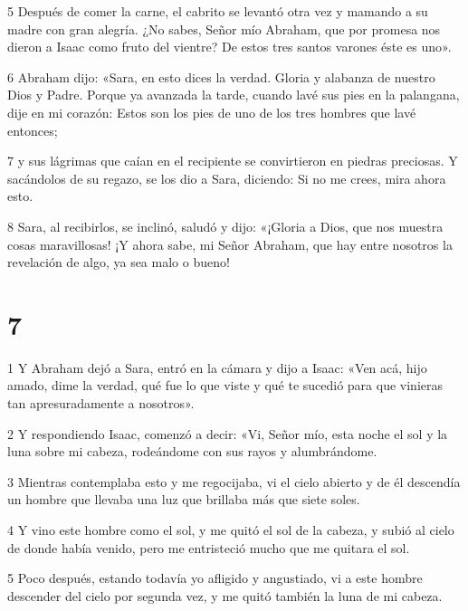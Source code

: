 \par 5 Después de comer la carne, el cabrito se levantó otra vez y mamando a su madre con gran alegría. ¿No sabes, Señor mío Abraham, que por promesa nos dieron a Isaac como fruto del vientre? De estos tres santos varones éste es uno».

\par 6 Abraham dijo: «Sara, en esto dices la verdad. Gloria y alabanza de nuestro Dios y Padre. Porque ya avanzada la tarde, cuando lavé sus pies en la palangana, dije en mi corazón: Estos son los pies de uno de los tres hombres que lavé entonces;

\par 7 y sus lágrimas que caían en el recipiente se convirtieron en piedras preciosas. Y sacándolos de su regazo, se los dio a Sara, diciendo: Si no me crees, mira ahora esto.

\par 8 Sara, al recibirlos, se inclinó, saludó y dijo: «¡Gloria a Dios, que nos muestra cosas maravillosas! ¡Y ahora sabe, mi Señor Abraham, que hay entre nosotros la revelación de algo, ya sea malo o bueno!


\chapter{7}

\par 1 Y Abraham dejó a Sara, entró en la cámara y dijo a Isaac: «Ven acá, hijo amado, dime la verdad, qué fue lo que viste y qué te sucedió para que vinieras tan apresuradamente a nosotros».

\par 2 Y respondiendo Isaac, comenzó a decir: «Vi, Señor mío, esta noche el sol y la luna sobre mi cabeza, rodeándome con sus rayos y alumbrándome.

\par 3 Mientras contemplaba esto y me regocijaba, vi el cielo abierto y de él descendía un hombre que llevaba una luz que brillaba más que siete soles.

\par 4 Y vino este hombre como el sol, y me quitó el sol de la cabeza, y subió al cielo de donde había venido, pero me entristeció mucho que me quitara el sol.

\par 5 Poco después, estando todavía yo afligido y angustiado, vi a este hombre descender del cielo por segunda vez, y me quitó también la luna de mi cabeza.

